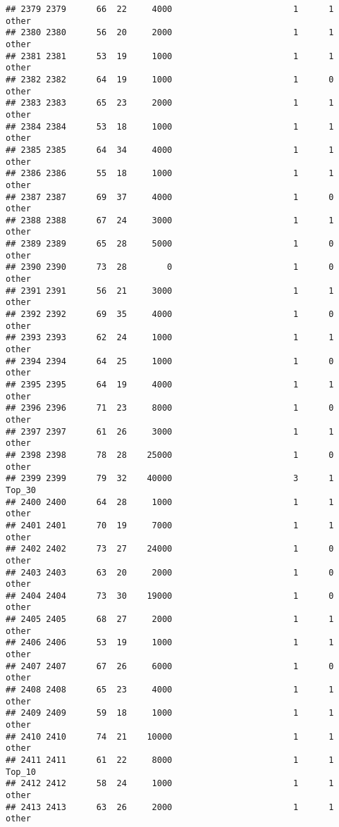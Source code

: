\documentclass[
]{article}
\begin{document}
\begin{verbatim}
## 2379 2379      66  22     4000                        1      1    other
## 2380 2380      56  20     2000                        1      1    other
## 2381 2381      53  19     1000                        1      1    other
## 2382 2382      64  19     1000                        1      0    other
## 2383 2383      65  23     2000                        1      1    other
## 2384 2384      53  18     1000                        1      1    other
## 2385 2385      64  34     4000                        1      1    other
## 2386 2386      55  18     1000                        1      1    other
## 2387 2387      69  37     4000                        1      0    other
## 2388 2388      67  24     3000                        1      1    other
## 2389 2389      65  28     5000                        1      0    other
## 2390 2390      73  28        0                        1      0    other
## 2391 2391      56  21     3000                        1      1    other
## 2392 2392      69  35     4000                        1      0    other
## 2393 2393      62  24     1000                        1      1    other
## 2394 2394      64  25     1000                        1      0    other
## 2395 2395      64  19     4000                        1      1    other
## 2396 2396      71  23     8000                        1      0    other
## 2397 2397      61  26     3000                        1      1    other
## 2398 2398      78  28    25000                        1      0    other
## 2399 2399      79  32    40000                        3      1   Top_30
## 2400 2400      64  28     1000                        1      1    other
## 2401 2401      70  19     7000                        1      1    other
## 2402 2402      73  27    24000                        1      0    other
## 2403 2403      63  20     2000                        1      0    other
## 2404 2404      73  30    19000                        1      0    other
## 2405 2405      68  27     2000                        1      1    other
## 2406 2406      53  19     1000                        1      1    other
## 2407 2407      67  26     6000                        1      0    other
## 2408 2408      65  23     4000                        1      1    other
## 2409 2409      59  18     1000                        1      1    other
## 2410 2410      74  21    10000                        1      1    other
## 2411 2411      61  22     8000                        1      1   Top_10
## 2412 2412      58  24     1000                        1      1    other
## 2413 2413      63  26     2000                        1      1    other

\end{verbatim}
\end{document}
